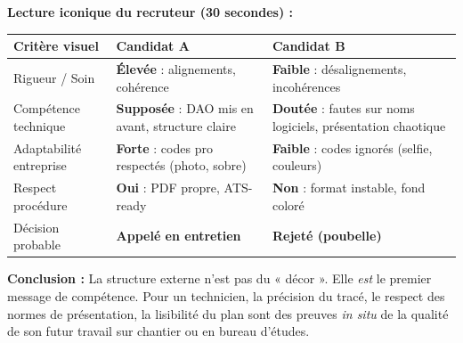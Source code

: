 \documentclass[11pt]{article}
\begin{document}
\begin{exoresolu}
\textbf{Lecture iconique du recruteur (30 secondes) :}
\begin{center}
\begin{tabularx}{\linewidth}{|l|X|X|}\hline
\textbf{Critère visuel} & \textbf{Candidat A} & \textbf{Candidat B} \\ \hline
Rigueur / Soin & \textbf{Élevée} : alignements, cohérence & \textbf{Faible} : désalignements, incohérences \\ \hline
Compétence technique & \textbf{Supposée} : DAO mis en avant, structure claire & \textbf{Doutée} : fautes sur noms logiciels, présentation chaotique \\ \hline
Adaptabilité entreprise & \textbf{Forte} : codes pro respectés (photo, sobre) & \textbf{Faible} : codes ignorés (selfie, couleurs) \\ \hline
Respect procédure & \textbf{Oui} : PDF propre, ATS-ready & \textbf{Non} : format instable, fond coloré \\ \hline
Décision probable & \textbf{Appelé en entretien} & \textbf{Rejeté (poubelle)} \\ \hline
\end{tabularx}
\end{center}

\textbf{Conclusion :} La structure externe n'est pas du « décor ». Elle \emph{est} le premier message de compétence. Pour un technicien, la précision du tracé, le respect des normes de présentation, la lisibilité du plan sont des preuves \emph{in situ} de la qualité de son futur travail sur chantier ou en bureau d'études.
\end{exoresolu}
\end{document}
